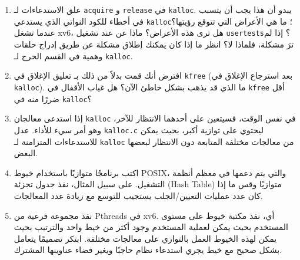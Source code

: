\begin{enumerate}
  \item علق الاستدعاءات لـ \lstinline{acquire} و \lstinline{release} في \lstinline{kalloc}. يبدو أن هذا يجب أن يتسبب في أخطاء للكود النواتي الذي يستدعي \lstinline{kalloc}؛ ما هي الأعراض التي تتوقع رؤيتها؟ عندما تشغل xv6، هل ترى هذه الأعراض؟ ماذا عن عند تشغيل \lstinline{usertests}؟ إذا لم ترَ مشكلة، فلماذا لا؟ انظر ما إذا كان يمكنك إطلاق مشكلة عن طريق إدراج حلقات وهمية في القسم الحرج لـ \lstinline{kalloc}.
  \item افترض أنك قمت بدلاً من ذلك بـ تعليق الإغلاق في \lstinline{kfree} (بعد استرجاع الإغلاق في \lstinline{kalloc}). ما الذي قد يذهب بشكل خاطئ الآن؟ هل غياب الأقفال في \lstinline{kfree} أقل ضررًا منه في \lstinline{kalloc}؟
  \item إذا استدعى معالجان \lstinline{kalloc} في نفس الوقت، فسيتعين على أحدهما الانتظار للآخر، وهو أمر سيء للأداء. عدل \lstinline{kalloc.c} ليحتوي على توازية أكبر، بحيث يمكن للاستدعاءات المتزامنة لـ \lstinline{kalloc} من معالجات مختلفة المتابعة دون الانتظار لبعضها البعض.
  \item اكتب برنامجًا متوازيًا باستخدام خيوط POSIX، والتي يتم دعمها في معظم أنظمة التشغيل. على سبيل المثال، نفذ جدول تجزئة (Hash Table) متوازيًا وقس ما إذا كان عدد عمليات التعيين/الجلب يستجيب للتوسع مع زيادة عدد المعالجات.
  \item نفذ مجموعة فرعية من Pthreads في xv6. أي، نفذ مكتبة خيوط على مستوى المستخدم بحيث يمكن لعملية المستخدم وجود أكثر من خيط واحد والترتيب بحيث يمكن لهذه الخيوط العمل بالتوازي على معالجات مختلفة. ابتكر تصميمًا يتعامل بشكل صحيح مع خيط يجري استدعاء نظام حاجبًا ويغير فضاء عناوينها المشترك.
\end{enumerate}
